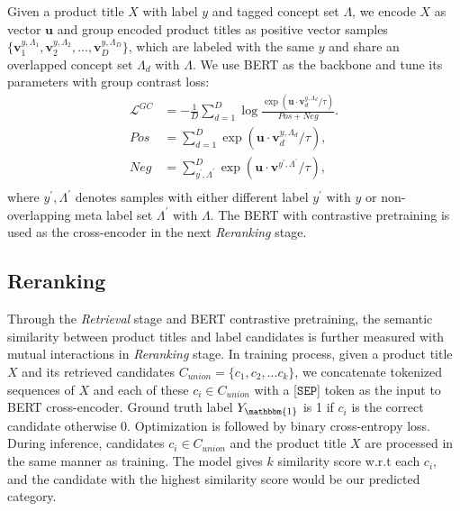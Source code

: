 Given a product title $X$ with label $y$ and tagged concept set $\Lambda$, we encode $X$ as vector $\mathbf{u}$ and group encoded product titles as positive vector samples 
$\{\mathbf{v}_1^{y,\Lambda_1}, \mathbf{v}_2^{y,\Lambda_2}, ..., \mathbf{v}_D^{y,\Lambda_D}\}$, which are labeled with the same $y$ and share an overlapped concept set $\Lambda_d$ with $\Lambda$. 
We use BERT as the backbone and tune its parameters with group contrast loss: 
\begin{equation}
    \begin{aligned}
    \mathcal{L}^{GC}&=-\frac{1}{D}\sum_{d=1}^{D}{\log\frac{\exp(\mathbf{u}\cdot\mathbf{v}_d^{y,\Lambda_d}/\tau)}{Pos+Neg}}. \\
    Pos&=\sum_{d=1}^{D}{\exp(\mathbf{u}\cdot\mathbf{v}_d^{y,\Lambda_d}/\tau)}, \\
    Neg&=\sum_{y^{\prime},\Lambda^{\prime}}^D
    {\exp(\mathbf{u}\cdot\mathbf{v}^{y^{\prime},\Lambda^{\prime}}/\tau)},\\
    \end{aligned}
\end{equation}
where $y^{\prime},\Lambda^{\prime}$ denotes samples with either different label $y^{\prime}$ with $y$ or non-overlapping meta label set $\Lambda^{\prime}$ with $\Lambda$. 
The BERT with contrastive pretraining is used as the cross-encoder in the next \textit{Reranking} stage.

\subsection{Reranking}
Through the \textit{Retrieval} stage and BERT contrastive pretraining, the semantic similarity between product titles and label candidates is further measured with mutual interactions in \textit{Reranking} stage. 
In training process, given a product title $X$ and its retrieved candidates $C_{union}=\{c_1, c_2, ... c_k\}$, we concatenate tokenized sequences of $X$ and each of these $c_i \in C_{union}$ with a [$\mathtt{SEP}$] token as the input to BERT cross-encoder. 
Ground truth label $Y_{\mathbbm{1}}$ is 1 if $c_i$ is the correct candidate otherwise 0. Optimization is followed by binary cross-entropy loss.
During inference, candidates $c_i \in C_{union}$ and the product title $X$ are processed in the same manner as training. The model gives $k$ similarity score w.r.t each $c_i$, and the candidate with the highest similarity score would be our predicted category.
